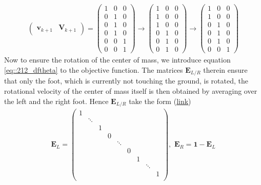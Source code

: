 \begin{align}
	\left(
	\begin{array}{c|c}
	\bm{v}_{k+1} & \bm{V}_{k+1}
	\end{array} 
	\right) =
	\left(
	\begin{array}{c|cc}
	1 & 0 & 0 \\
	0 & 1 & 0 \\
	0 & 1 & 0 \\ 
	0 & 1 & 0 \\
	0 & 0 & 1 \\
	0 & 0 & 1
	\end{array}\right) \rightarrow
	\left(
	\begin{array}{c|cc}
	1 & 0 & 0 \\
	1 & 0 & 0 \\
	1 & 0 & 0 \\ 
	0 & 1 & 0 \\
	0 & 1 & 0 \\
	0 & 1 & 0
	\end{array}\right) \rightarrow
	\left(
	\begin{array}{c|cc}
	1 & 0 & 0 \\
	1 & 0 & 0 \\
	0 & 1 & 0 \\ 
	0 & 1 & 0 \\
	0 & 1 & 0 \\
	0 & 0 & 1
	\end{array}\right)
\end{align}
Now to ensure the rotation of the center of mass, we introduce equation \ref{eq::212_dftheta} to the objective function. The matrices $\bm{E}_{L/R}$ therein ensure that only the foot, which is currently not touching the ground, is rotated, the rotational velocity of the center of mass itself is then obtained by averaging over the left and the right foot. Hence $\bm{E}_{L/R}$ take the form (\href{https://github.com/mhubii/nmpc_pattern_generator/blob/5a213044c927dc6aac9f7e32ce1e5fb472cd67bb/libs/pattern_generator/src/base_generator.cpp#L1281}{\underline{link}})
\begin{align}
	\bm{E}_L = \begin{pmatrix}
	1&&&&&&&& \\
	&\ddots&&&&&&& \\
	&&1&&&&&& \\
	&&&0&&&&& \\
	&&&&\ddots&&&& \\
	&&&&&0&&& \\
	&&&&&&1&& \\
	&&&&&&&\ddots& \\
	&&&&&&&&1 \\
	\end{pmatrix},\,\,
	\bm{E}_R = \bm{1} - \bm{E}_L
\end{align}
